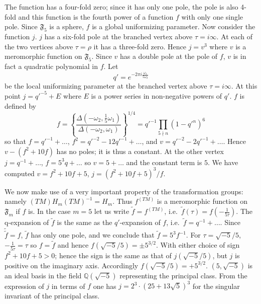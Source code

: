 The function has a four-fold zero; since it has only one pole, the pole
is also 4-fold and this function is the fourth power of a function $f$
with only one single pole. Since $\mathfrak{F}_{5}$ is a sphere, $f$ is a
global uniformizing parameter. Now consider the function $j$. $j$ has a
six-fold pole at the branched vertex above $\tau=i\infty$. At each of the
two vertices above $\tau=\rho$ it has a three-fold zero. Hence
$j=v^{3}$ where $v$ is a meromorphic function on $\mathfrak{F}_{5}$.
Since $v$ has a double pole at the pole of $f$, $v$ is in fact a
quadratic polynomial in $f$. Let
\[
q'=e^{-2\pi i\frac{\omega_{1}}{5\omega_{2}}}
\]
be the local uniformizing parameter at the branched vertex above
$\tau=i\infty$. At this point $j=q'^{-5}+E$ where $E$ is a power series
in non-negative powers of $q'$. $f$ is defined by
\[
f=\left\{\frac{\Delta(-\omega_{2},\frac{1}{5}\omega_{1})}
{\Delta(-\omega_{2},\omega_{1})}\right\}^{1/4}
=q'^{-1}\prod_{5\nmid n}(1-q'^{n})^{6}
\]
so that $f=q'^{-1}+\ldots$, $f^{2}=q'^{-2}-12q'^{-1}+\ldots$, and
$v=q'^{-2}-2q'^{-1}+\dots$. Hence $v-(f^{2}+10f)$ has no poles; it is
thus a constant. At the other vertex $j=q^{-1}+\ldots$, $f=5^{3}q+\dots$
so $v=5+\dots$ and the constant term is $5$. We have computed
$v=f^{2}+10f+5$, $j=(f^{2}+10f+5)^{3}/f$.

We now make use of a very important property of the transformation
groups: namely $(TM)H_{m}(TM)^{-1}=H_{m}$. Thus $f^{(TM)}$ is a
meromorphic function on $\mathfrak{F}_{m}$ if $f$ is. In the case $m=5$
let us write $\tilde{f}=f^{(TM)}$, i.e.\ $\tilde{f}(\tau)
=f(-\frac{1}{5\tau})$. The q-expansion of $\tilde{f}$ is the same as the
$q'$-expansion of $f$, i.e.\ $\tilde{f}=q^{-1}+\dots$. Since
$\tilde{\tilde{f}}=f$, $\tilde{f}$ has only one pole, and we conclude
that $\tilde{f}=5^{3}f^{-1}$. For $\tau=\sqrt{-5}/5$,
$-\frac{1}{5\tau}=\tau$ so $f=\tilde{f}$ and hence
$f(\sqrt{-5}/5)=\pm 5^{3/2}$. With either choice of sign
$f^{2}+10f+5>0$; hence the sign is the same as that of
$j(\sqrt{-5}/5)$, but $j$ is positive on the imaginary axis. Accordingly
$f(\sqrt{-5}/5)=+5^{3/2}$. $(5,\sqrt{-5})$ is an ideal basis in the field
$\mathbb{Q}(\sqrt{-5})$ representing the principal class. From the
expression of $j$ in terms of $f$ one has
$j=2^{3}\cdot(25+13\sqrt{5})^{3}$ for the singular invariant of
the principal class.
